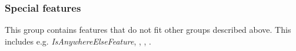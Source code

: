 \subsubsection{Special features}
This group contains features that do not fit other groups described above. This includes e.g. \textit{IsAnywhereElseFeature}, , , .